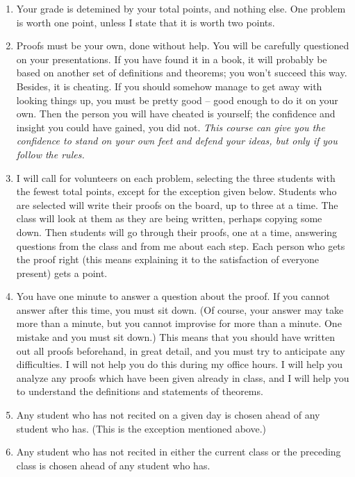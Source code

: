 \documentclass{article}
\begin{document}
\begin{enumerate}[1.]

  \item Your grade is detemined by your total points, and nothing else. One problem is worth one point, unless I state that it is worth two points.

  \item Proofs must be your own, done without help. You will be carefully questioned on your presentations. If you have found it in a book, it will probably be based on another set of definitions and theorems; you won't succeed this way. Besides, it is cheating. If you should somehow manage to get away with looking things up, you must be pretty good -- good enough to do it on your own. Then the person you will have cheated is yourself; the confidence and insight you could have gained, you did not. \emph{This course can give you the confidence to stand on your own feet and defend your ideas, but only if you follow the rules.}

  \item I will call for volunteers on each problem, selecting the three students with the fewest total points, except for the exception given below. Students who are selected will write their proofs on the board, up to three at a time. The class will look at them as they are being written, perhaps copying some down. Then students will go through their proofs, one at a time, answering questions from the class and from me about each step. Each person who gets the proof right (this means explaining it to the satisfaction of everyone present) gets a point.

  \item You have one minute to answer a question about the proof. If you cannot answer after this time, you must sit down. (Of course, your answer may take more than a minute, but you cannot improvise for more than a minute. One mistake and you must sit down.) This means that you should have written out all proofs beforehand, in great detail, and you must try to anticipate any difficulties. I will not help you do this during my office hours. I will help you analyze any proofs which have been given already in class, and I will help you to understand the definitions and statements of theorems.

  \item Any student who has not recited on a given day is chosen ahead of any student who has. (This is the exception mentioned above.)

  \item Any student who has not recited in either the current class or the preceding class is chosen ahead of any student who has.


\end{enumerate}
\end{document}
